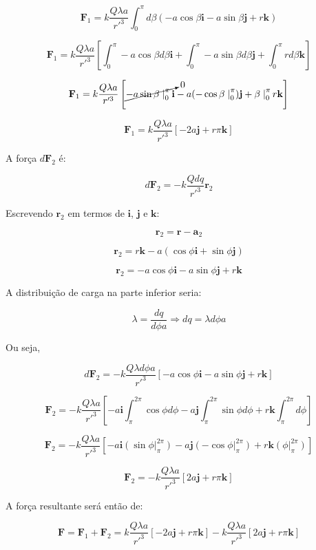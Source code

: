 \documentclass[a4paper, 12pt]{article}
\begin{document}
	\[
	\textbf{F}_1=k\frac{Q\lambda a}{r'^3}\int_{0}^{\pi}d\beta\left(-a\cos\beta\textbf{i}-a\sin\beta\textbf{j}+r\textbf{k}\right)
	\]
	
	\[
	\textbf{F}_1=k\frac{Q\lambda a}{r'^3}\left[\int_{0}^{\pi}-a\cos\beta d\beta\textbf{i}+\int_{0}^{\pi}-a\sin\beta d\beta\textbf{j}+\int_{0}^{\pi}rd\beta\textbf{k}\right]
	\]
	
	
	\[
	\textbf{F}_1=k\frac{Q\lambda a}{r'^3}\left[\cancelto{0}{-a\sin\beta\left.\right|_{0}^\pi\textbf{i}}-a(-\cos\beta\left.\right|_{0}^\pi)\textbf{j}+\beta\left.\right|_{0}^\pi r\textbf{k}\right]
	\]
	
	\[
	\textbf{F}_1=k\frac{Q\lambda a}{r'^3}\left[-2a\textbf{j}+r\pi\textbf{k}\right]
	\]
	
	A força $d\textbf{F}_2$ é:
	
	\[
	d\textbf{F}_2=-k\frac{Qdq}{r'^3}\textbf{r}_2
	\]
	
	Escrevendo $\textbf{r}_2$ em termos de $\textbf{i}$, $\textbf{j}$ e $\textbf{k}$:
	
	\[
	\textbf{r}_2=\textbf{r}-\textbf{a}_2
	\]
	
	\[
	\textbf{r}_2=r\textbf{k}-a(\cos\phi\textbf{i}+\sin\phi\textbf{j})
	\]
	
	\[
	\textbf{r}_2=-a\cos\phi\textbf{i}-a\sin\phi\textbf{j}+r\textbf{k}
	\]
	
	A distribuição de carga na parte inferior seria:
	
	\[
	\lambda=\frac{dq}{d\phi a}\Rightarrow dq=\lambda d\phi a
	\]
	
	Ou seja,
	
	\[
	d\textbf{F}_2=-k\frac{Q\lambda d\phi a}{r'^3}\left[-a\cos\phi\textbf{i}-a\sin\phi\textbf{j}+r\textbf{k}\right]
	\]
	
	\[
	\textbf{F}_2=-k\frac{Q\lambda a}{r'^3}\left[-a\textbf{i}\int_{\pi}^{2\pi}\cos\phi d\phi-a\textbf{j}\int_{\pi}^{2\pi}\sin\phi d\phi+r\textbf{k}\int_{\pi}^{2\pi}d\phi\right]
	\]
	
	\[
	\textbf{F}_2=-k\frac{Q\lambda a}{r'^3}\left[-a\textbf{i}\left(\sin\phi\left.\right|_{\pi}^{2\pi}\right)-a\textbf{j}\left(-\cos\phi\left.\right|_{\pi}^{2\pi}\right)+r\textbf{k}\left(\phi\left.\right|_{\pi}^{2\pi}\right)\right]
	\]
	
	\[
	\textbf{F}_2=-k\frac{Q\lambda a}{r'^3}\left[2a\textbf{j}+r\pi\textbf{k}\right]
	\]
	
	A força resultante será então de:
	
	\[
	\textbf{F}=\textbf{F}_1+\textbf{F}_2=k\frac{Q\lambda a}{r'^3}\left[-2a\textbf{j}+r\pi\textbf{k}\right]-k\frac{Q\lambda a}{r'^3}\left[2a\textbf{j}+r\pi\textbf{k}\right]
	\]
	
\end{document}

